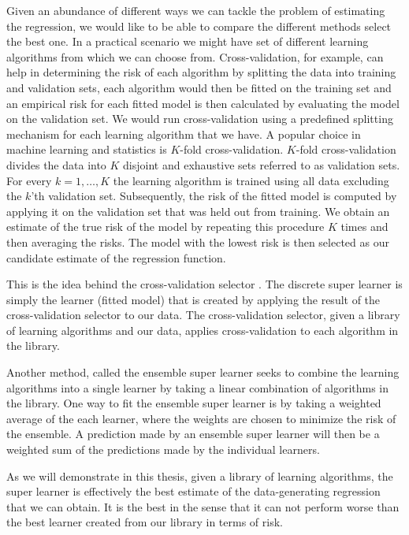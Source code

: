 \documentclass[11pt, a4paper]{article}
\theoremstyle{definition}
\theoremstyle{remark}
\begin{document}
Given an abundance of different ways we can tackle the problem of estimating the regression, we would like to be able to compare the different methods select the best one. In a practical scenario we might have set of different learning algorithms from which we can choose from. Cross-validation, for example, can help in determining the risk of each algorithm by splitting the data into training and validation sets, each algorithm would then be fitted on the training set and an empirical risk for each fitted model is then calculated by evaluating the model on the validation set. We would run cross-validation using a predefined splitting mechanism for each learning algorithm that we have. A popular choice in machine learning and statistics is $ K $-fold cross-validation. $ K $-fold cross-validation divides the data into $ K $ disjoint and exhaustive sets referred to as validation sets. For every $ k = 1, \dots , K $ the learning algorithm is trained using all data excluding the $ k $'th validation set. Subsequently, the risk of the fitted model is computed by applying it on the validation set that was held out from training. We obtain an estimate of the true risk of the model by repeating this procedure $ K $ times and then averaging the risks. The model with the lowest risk is then selected as our candidate estimate of the regression function. 

This is the idea behind the cross-validation selector \parencite{laan03}. The discrete super learner \parencite{van2007super} is simply the learner (fitted model) that is created by applying the result of the cross-validation selector to our data. The cross-validation selector, given a library of learning algorithms and our data, applies cross-validation to each algorithm in the library. 

Another method, called the ensemble super learner \parencite{van2007super} seeks to combine the learning algorithms into a single learner by taking a linear combination of algorithms in the library. One way to fit the ensemble super learner is by taking a weighted average of the each learner, where the weights are chosen to minimize the risk of the ensemble. A prediction made by an ensemble super learner will then be a weighted sum of the predictions made by the individual learners.

As we will demonstrate in this thesis, given a library of learning algorithms, the super learner is effectively the best estimate of the data-generating regression that we can obtain. It is the best in the sense that it can not perform worse than the best learner created from our library in terms of risk. 
\end{document}
